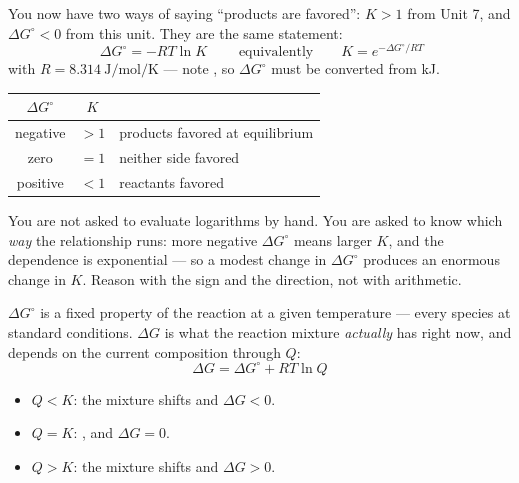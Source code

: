 \documentclass{apchem-notes}
\begin{document}


You now have two ways of saying ``products are favored'': $K > 1$ from
Unit 7, and $\Delta G^\circ < 0$ from this unit. They are the same
statement:
\[ \boxed{\;\Delta G^\circ = -RT\ln K\;}
   \qquad\text{equivalently}\qquad K = e^{-\Delta G^\circ/RT} \]
with $R = \SI{8.314}{\joule\per\mole\per\kelvin}$ --- note
, so $\Delta G^\circ$ must be converted from kJ.

\begin{center}
\renewcommand{\arraystretch}{1.2}
\begin{tabular}{@{}ccl@{}}
\hline
$\Delta G^\circ$ & $K$ & \\
\hline
negative & $> 1$ & products favored at equilibrium \\
zero     & $= 1$ & neither side favored \\
positive & $< 1$ & reactants favored \\
\hline
\end{tabular}
\end{center}

\begin{apcnote}
You are not asked to evaluate logarithms by hand. You are asked to know
which \emph{way} the relationship runs: more negative $\Delta G^\circ$ means
larger $K$, and the dependence is exponential --- so a modest change in
$\Delta G^\circ$ produces an enormous change in $K$. Reason with the sign
and the direction, not with arithmetic.
\end{apcnote}



$\Delta G^\circ$ is a fixed property of the reaction at a given temperature
--- every species at standard conditions. $\Delta G$ is what the reaction
mixture \emph{actually} has right now, and depends on the current
composition through $Q$:
\[ \Delta G = \Delta G^\circ + RT\ln Q \]

\begin{itemize}[leftmargin=*,itemsep=0.3em]
  \item $Q < K$: the mixture shifts  and
        $\Delta G < 0$.
  \item $Q = K$: , and $\Delta G = 0$.
  \item $Q > K$: the mixture shifts  and
        $\Delta G > 0$.
\end{itemize}
\end{document}
